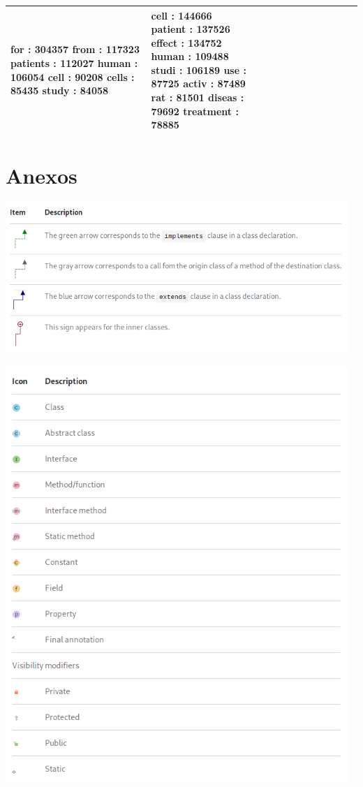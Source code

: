 \documentclass[12pt]{article}
\begin{document}
\begin{tabular}{| p{0.4\linewidth} | p{0.3\linewidth} | p{0.3\linewidth} |}
       for : 304357 \newline
      from : 117323 \newline
  patients : 112027 \newline
     human : 106054 \newline
      cell : 90208 \newline
     cells : 85435 \newline
     study : 84058
     &
      cell : 144666 \newline
   patient : 137526 \newline
    effect : 134752 \newline
     human : 109488 \newline
     studi : 106189 \newline
       use : 87725 \newline
     activ : 87489 \newline
       rat : 81501 \newline
    diseas : 79692 \newline
 treatment : 78885
     \\
    \hline
\end{tabular}
\newpage

\section{Anexos}

\includegraphics[width=13cm]{arrow_legend.png}

\includegraphics[width=13cm]{icons_legend.png}
\end{document}
